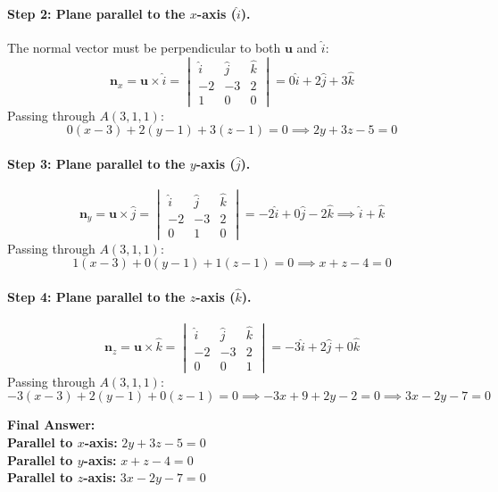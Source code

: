\documentclass[11pt,a4paper]{article}
\begin{document}
\paragraph{Step 2: Plane parallel to the $x$-axis ($\hat{i}$).}
The normal vector must be perpendicular to both $\mathbf{u}$ and $\hat{i}$:
$$\mathbf{n}_x = \mathbf{u} \times \hat{i} = \begin{vmatrix} \hat{i} & \hat{j} & \hat{k} \\ -2 & -3 & 2 \\ 1 & 0 & 0 \end{vmatrix} = 0\hat{i} + 2\hat{j} + 3\hat{k}$$
Passing through $A(3, 1, 1)$:
$$0(x - 3) + 2(y - 1) + 3(z - 1) = 0 \implies 2y + 3z - 5 = 0$$

\paragraph{Step 3: Plane parallel to the $y$-axis ($\hat{j}$).}
$$\mathbf{n}_y = \mathbf{u} \times \hat{j} = \begin{vmatrix} \hat{i} & \hat{j} & \hat{k} \\ -2 & -3 & 2 \\ 0 & 1 & 0 \end{vmatrix} = -2\hat{i} + 0\hat{j} - 2\hat{k} \implies \hat{i} + \hat{k}$$
Passing through $A(3, 1, 1)$:
$$1(x - 3) + 0(y - 1) + 1(z - 1) = 0 \implies x + z - 4 = 0$$

\paragraph{Step 4: Plane parallel to the $z$-axis ($\hat{k}$).}
$$\mathbf{n}_z = \mathbf{u} \times \hat{k} = \begin{vmatrix} \hat{i} & \hat{j} & \hat{k} \\ -2 & -3 & 2 \\ 0 & 0 & 1 \end{vmatrix} = -3\hat{i} + 2\hat{j} + 0\hat{k}$$
Passing through $A(3, 1, 1)$:
$$-3(x - 3) + 2(y - 1) + 0(z - 1) = 0 \implies -3x + 9 + 2y - 2 = 0 \implies 3x - 2y - 7 = 0$$

\begin{resultbox}
\textbf{Final Answer:}\\
\textbf{Parallel to $x$-axis:} $\boxed{2y + 3z - 5 = 0}$\\
\textbf{Parallel to $y$-axis:} $\boxed{x + z - 4 = 0}$\\
\textbf{Parallel to $z$-axis:} $\boxed{3x - 2y - 7 = 0}$
\end{resultbox}
\end{document}
